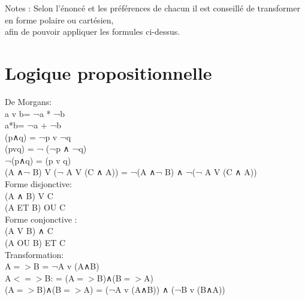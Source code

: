 \vspace{8mm} %

Notes : Selon l'énoncé et les préférences de chacun il est conseillé de transformer en forme polaire ou cartésien,\\
afin de pouvoir appliquer les formules ci-dessus.\\


\newpage
\section{Logique propositionnelle}

\vspace{5mm} %
De Morgans: \\
a v b= ¬a * ¬b\\
a*b= ¬a + ¬b\\
(p∧q) = ¬p v ¬q  \\
(pvq) = ¬ (¬p ∧ ¬q)  \\
¬(p∧q) = (p v q)  \\
(A ∧¬ B) V (¬ A V (C ∧ A)) =  ¬(A ∧¬ B) ∧ ¬(¬ A V (C ∧ A))\\

\vspace{5mm} %
Forme disjonctive: \\
(A ∧ B) V C\\
(A ET B) OU C \\

\vspace{5mm} %
Forme conjonctive : \\
(A V B) ∧ C\\
(A OU B) ET C \\

\vspace{5mm} %
Transformation: \\
A$=>$B = ¬A v (A∧B) \\
A$<=>$B: = (A$=>$B)∧(B$=>$A)  \\
(A$=>$B)∧(B$=>$A) = (¬A v (A∧B)) ∧ (¬B v (B∧A))
